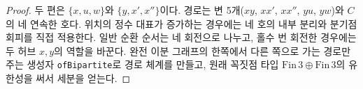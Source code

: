 \begin{proof}
\leanok
두 편은 \(\{x, u, w\}\)와 \(\{y, x', x''\}\)이다. 경로는 변 5개(\(xy\), \(xx'\), \(xx''\), \(yu\), \(yw\))와
\(C\)의 네 연속한 호다. 위치의 정수 대표가 증가하는 경우에는 네 호의 내부 분리와 분기점 회피를
직접 적용한다. 일반 순환 순서는 네 회전으로 나누고, 홀수 번 회전한 경우에는 두 허브 \(x,y\)의 역할을
바꾼다. 완전 이분 그래프의 한쪽에서 다른 쪽으로 가는 경로만 주는 생성자 \texttt{ofBipartite}로 경로
체계를 만들고, 원래 꼭짓점 타입 \(\mathrm{Fin}\,3 \oplus \mathrm{Fin}\,3\)의 유한성을 써서 세분을 얻는다.
\end{proof}
